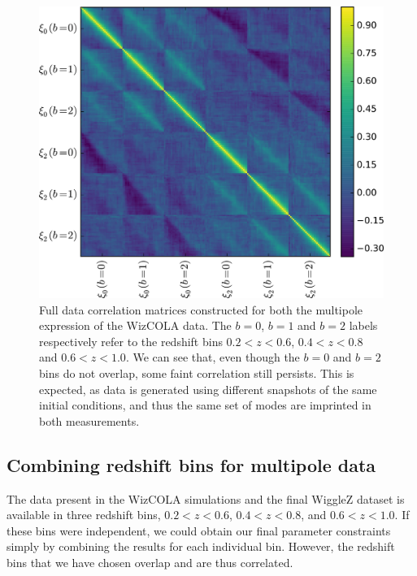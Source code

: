 \documentclass[a4paper,fleqn,usenatbib]{mnras}
\begin{document}
\begin{figure}
	\begin{center}
		\includegraphics[width=\columnwidth]{fullCorrelations.png}
	\end{center}
	\caption{Full data correlation matrices constructed for both the multipole expression of the WizCOLA data. The $b=0$, $b=1$ and $b=2$ labels respectively refer to the redshift bins $0.2 < z < 0.6$, $0.4 < z < 0.8$ and $0.6 < z < 1.0$. We can see that, even though the $b=0$ and $b=2$ bins do not overlap, some faint correlation still persists. This is expected, as data is generated using different snapshots of the same initial conditions, and thus the same set of modes are imprinted in both measurements.}
	\label{fig:fullCorrelations}
\end{figure}



\subsection{Combining redshift bins for multipole data}

The data present in the WizCOLA simulations and the final WiggleZ dataset is available in three redshift bins, $0.2 < z < 0.6$, $0.4 < z < 0.8$, and $0.6 < z < 1.0$. If these bins were independent, we could obtain our final parameter constraints  simply by combining the results for each individual bin. However, the redshift bins that we have chosen overlap and are thus correlated. 
\end{document}
